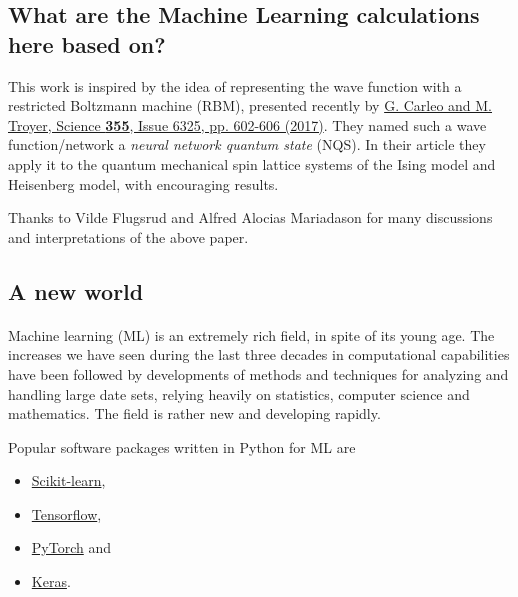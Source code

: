 \documentclass[%
oneside,                 %
final,                   %
10pt]{article}
\begin{document}
\noindent



\subsection{What are the Machine Learning calculations here based on?}

This work is inspired by the idea of representing the wave function with
a restricted Boltzmann machine (RBM), presented recently by \href{{http://science.sciencemag.org/content/355/6325/602}}{G. Carleo and M. Troyer, Science \textbf{355}, Issue 6325, pp. 602-606 (2017)}. They
named such a wave function/network a \emph{neural network quantum state} (NQS). In their article they apply it to the quantum mechanical
spin lattice systems of the Ising model and Heisenberg model, with
encouraging results.

Thanks to Vilde Flugsrud and Alfred Alocias Mariadason for many discussions and interpretations of the above paper.


\subsection{A new world}

\paragraph{}
Machine learning (ML) is an extremely rich field, in spite of its young age. The
increases we have seen during the last three decades in computational
capabilities have been followed by developments of methods and
techniques for analyzing and handling large date sets, relying heavily
on statistics, computer science and mathematics.  The field is rather
new and developing rapidly. 

Popular software packages written in Python for ML are

\begin{itemize}
\item \href{{http://scikit-learn.org/stable/}}{Scikit-learn}, 

\item \href{{https://www.tensorflow.org/}}{Tensorflow},

\item \href{{http://pytorch.org/}}{PyTorch} and 

\item \href{{https://keras.io/}}{Keras}.
\end{itemize}
\end{document}
